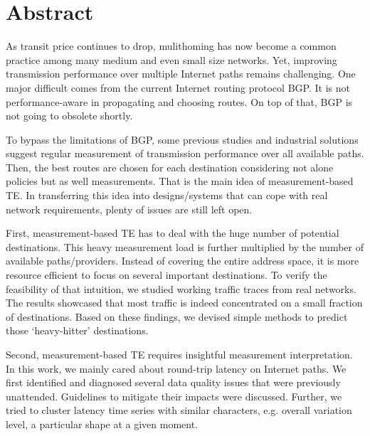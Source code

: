 \begingroup
\let\clearpage\relax
\let\cleardoublepage\relax
\let\cleardoublepage\relax

\chapter*{Abstract}

As transit price continues to drop, mulithoming has now become a common practice among many medium and even small size networks. Yet, improving transmission performance over multiple Internet paths remains challenging.
One major difficult comes from the current Internet routing protocol \acf{BGP}.
It is not performance-aware in propagating and choosing routes. 
On top of that, \ac{BGP} is not going to obsolete shortly.

To bypass the limitations of \ac{BGP}, some previous studies and industrial solutions suggest regular measurement of transmission performance over all available paths.
Then, the best routes are chosen for each destination considering not alone policies but as well measurements. That is the main idea of measurement-based \acf{TE}.
In transferring this idea into designs/systems that can cope with real network requirements, plenty of  issues are still left open.

First, measurement-based TE has to deal with the huge number of potential destinations.
This heavy measurement load is further multiplied by the number of available paths/providers.
Instead of covering the entire address space, it is more resource efficient to focus on several important destinations.
To verify the feasibility of that intuition, we studied working traffic traces from real networks.
The results showcased that most traffic is indeed concentrated on a small fraction of destinations.
Based on these findings, we devised simple methods to predict those `heavy-hitter' destinations.

Second, measurement-based TE requires insightful measurement interpretation.
In this work, we mainly cared about round-trip latency on Internet paths.
We first identified and diagnosed several data quality issues that were previously unattended.
Guidelines to mitigate their impacts were discussed.
Further, we tried to cluster latency time series with similar characters, e.g. overall variation level, a particular shape at a given moment.

